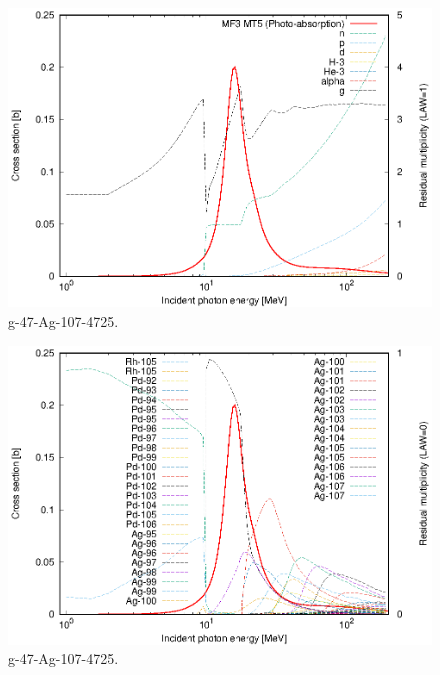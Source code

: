 \begin{figure}
 \includegraphics[width=\linewidth]{eps/g_47-Ag-107_4725.eps}
  \caption{g-47-Ag-107-4725.}
\end{figure}
\begin{figure}
 \includegraphics[width=\linewidth]{eps-law0/g_47-Ag-107_4725.eps}
 \caption{g-47-Ag-107-4725.}
\end{figure}
\newpage \clearpage

